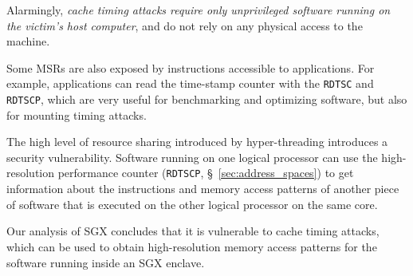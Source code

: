 Alarmingly, {\em cache timing attacks require only unprivileged software
running on the victim's host computer}, and do not rely on any physical
access to the machine.

Some MSRs are also
exposed by instructions accessible to applications. For example, applications
can read the time-stamp counter with the \texttt{RDTSC} and \texttt{RDTSCP},
which are very useful for benchmarking and optimizing software, but also for
mounting timing attacks.

The high level of resource sharing introduced by hyper-threading introduces a
security vulnerability. Software running on one logical processor can use the
high-resolution performance counter (\texttt{RDTSCP},
\S~\ref{sec:address_spaces}) \cite{petters1999making} to get information about
the instructions and memory access patterns of another piece of software that
is executed on the other logical processor on the same core.

Our analysis of SGX concludes that it is vulnerable to cache timing attacks,
which can be used to obtain high-resolution memory access patterns for the
software running inside an SGX enclave.
